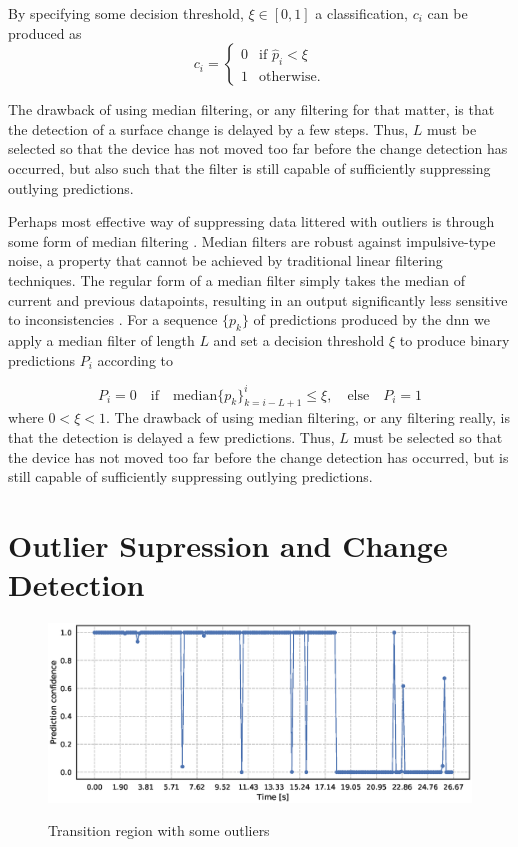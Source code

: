 By specifying some decision threshold, $\xi\in [0,1]$ a classification, $c_i$ can be produced as
\begin{equation}
	c_i = \begin{cases}
		0 & \text{if $\hat{p}_i<\xi$} \\
		1 & \text{otherwise}.
	\end{cases}
\end{equation}

The drawback of using median filtering, or any filtering for that matter, is that the detection of a surface change is delayed by a few steps. Thus, $L$ must be selected so that the device has not moved too far before the change detection has occurred, but also such that the filter is still capable of sufficiently  suppressing outlying predictions. 

\iffalse
Perhaps most effective way of suppressing data littered with outliers is through some form of median filtering \citep{yin_yang_gabbouj_neuvo_1996}. Median filters are robust against impulsive-type noise, a property that cannot be achieved by traditional linear filtering techniques. The regular form of a median filter simply takes the median of current and previous datapoints, resulting in an output significantly less sensitive to inconsistencies \citep{pearson_2002}. For a sequence $\{p_k\}$ of predictions produced by the \gls{dnn} we apply a median filter of length $L$ and set a decision threshold $\xi$ to produce binary predictions $P_i$ according to
\citep{yin_yang_gabbouj_neuvo_1996}

\begin{equation}
	P_i=0 \quad\text{if}\quad\text{median}\{p_k\}_{k=i-L+1}^i\leq\xi, 
	\quad \text{else} \quad P_i = 1
\end{equation}
where $0<\xi<1$. The drawback of using median filtering, or any filtering really, is that the detection is delayed a few predictions. Thus, $L$ must be selected so that the device has not moved too far before the change detection has occurred, but is still capable of sufficiently  suppressing outlying predictions. 


\section{Outlier Supression and Change Detection}


\begin{figure}
	\includegraphics[scale=0.5]{figs_temp/detect_nothing}
	\label{fig:detect_no}
	\caption{Transition region with some outliers}
\end{figure}

